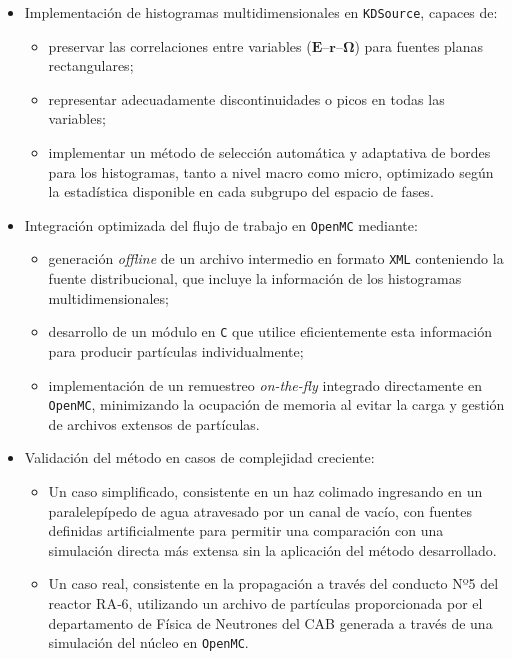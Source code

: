 \begin{itemize}
    \item Implementación de histogramas multidimensionales en \texttt{KDSource}, capaces de:
    \begin{itemize}
        \item preservar las correlaciones entre variables ($\mathbf{E}$–$\mathbf{r}$–$\boldsymbol{\Omega}$) para fuentes planas rectangulares;
        \item representar adecuadamente discontinuidades o picos en todas las variables;
        \item implementar un método de selección automática y adaptativa de bordes para los histogramas, tanto a nivel macro como micro, optimizado según la estadística disponible en cada subgrupo del espacio de fases.
    \end{itemize}

    \item Integración optimizada del flujo de trabajo en \texttt{OpenMC} mediante:
    \begin{itemize}
        \item generación \emph{offline} de un archivo intermedio en formato \texttt{XML} conteniendo la fuente distribucional, que incluye la información de los histogramas multidimensionales;
        \item desarrollo de un módulo en \texttt{C} que utilice eficientemente esta información para producir partículas individualmente;
        \item implementación de un remuestreo \emph{on-the-fly} integrado directamente en \texttt{OpenMC}, minimizando la ocupación de memoria al evitar la carga y gestión de archivos extensos de partículas.
    \end{itemize}

    \item Validación  del método en casos de complejidad creciente:
    \begin{itemize}
        \item Un caso simplificado, consistente en un haz colimado ingresando en un paralelepípedo de agua atravesado por un canal de vacío, con fuentes definidas artificialmente para permitir una comparación con una simulación directa más extensa sin la aplicación del método desarrollado. 
        \item Un caso real, consistente en la propagación a través del conducto Nº5 del reactor RA‑6, utilizando un archivo de partículas proporcionada por el departamento de Física de Neutrones del CAB generada a través de una simulación del núcleo en \texttt{OpenMC}.
    \end{itemize}
\end{itemize}




